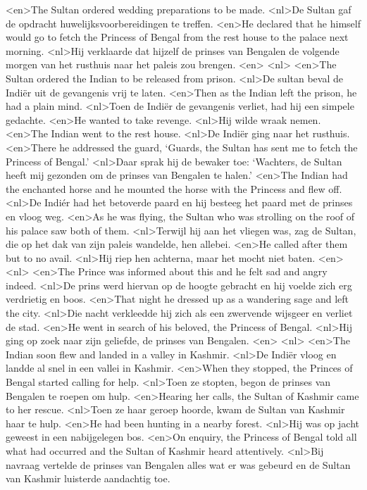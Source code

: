 <en>The Sultan ordered wedding preparations to be made.
<nl>De Sultan gaf de opdracht huwelijksvoorbereidingen te treffen.
<en>He declared that he himself would go to fetch the Princess of Bengal from the rest house to the palace next morning.
<nl>Hij verklaarde dat hijzelf de prinses van Bengalen de volgende morgen van het rusthuis naar het paleis zou brengen.
<en>
<nl>
<en>The Sultan ordered the Indian to be released from prison.
<nl>De sultan beval  de Indi\"er uit de gevangenis vrij te laten.
<en>Then as the Indian left the prison, he had a plain mind.
<nl>Toen de Indi\"er de gevangenis verliet, had hij een simpele gedachte.
<en>He wanted to take revenge.
<nl>Hij wilde wraak nemen.
<en>The Indian went to the rest house.
<nl>De Indi\"er ging naar het rusthuis.
<en>There he addressed the guard, `Guards, the Sultan has sent me to fetch the Princess of Bengal.'
<nl>Daar sprak hij de bewaker toe: `Wachters, de Sultan heeft mij gezonden om de prinses van Bengalen te halen.'
<en>The Indian had the enchanted horse and he mounted the horse with the Princess and flew off.
<nl>De Indi\'er had het betoverde paard en hij besteeg het paard met de prinses en vloog weg.
<en>As he was flying, the Sultan who was strolling on the roof of his palace saw both of them.
<nl>Terwijl hij aan het vliegen was, zag de Sultan, die op het dak van zijn paleis wandelde, hen allebei.
<en>He called after them but to no avail.
<nl>Hij riep hen achterna, maar het mocht niet baten.
<en>
<nl>
<en>The Prince was informed about this and he felt sad and angry indeed.
<nl>De prins werd hiervan op de hoogte gebracht en hij voelde zich erg verdrietig en boos.
<en>That night he dressed up as a wandering sage and left the city.
<nl>Die nacht verkleedde hij zich als een zwervende wijsgeer en verliet de stad.
<en>He went in search of his beloved, the Princess of Bengal.
<nl>Hij ging op zoek naar zijn geliefde, de prinses van Bengalen.
<en>
<nl>
<en>The Indian soon flew and landed in a valley in Kashmir.
<nl>De Indi\"er vloog en landde  al snel in een vallei in Kashmir.
<en>When they stopped, the Princes of Bengal started calling for help.
<nl>Toen ze stopten, begon de prinses van Bengalen te roepen om hulp.
<en>Hearing her calls, the Sultan of Kashmir came to her rescue.
<nl>Toen ze haar geroep hoorde, kwam de Sultan van Kashmir haar te hulp.
<en>He had been hunting in a nearby forest.
<nl>Hij was op jacht geweest in een nabijgelegen bos.
<en>On enquiry, the Princess of Bengal told all what had occurred and the Sultan of Kashmir heard attentively.
<nl>Bij navraag vertelde de prinses van Bengalen alles wat er was gebeurd en de Sultan van Kashmir luisterde aandachtig toe.
